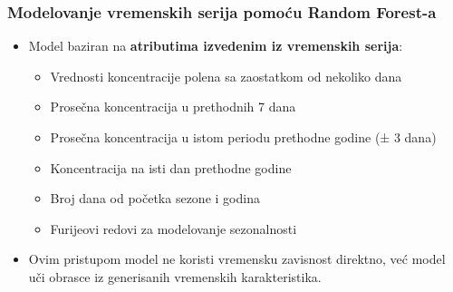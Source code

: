 \begin{frame}
    \frametitle{Modelovanje vremenskih serija pomoću Random Forest-a}

    \begin{itemize}
        \item Model baziran na \textbf{atributima izvedenim iz vremenskih serija}:
        \begin{itemize}
            \item Vrednosti koncentracije polena sa zaostatkom od nekoliko dana
            \item Prosečna koncentracija u prethodnih 7 dana
            \item Prosečna koncentracija u istom periodu prethodne godine (± 3 dana)
            \item Koncentracija na isti dan prethodne godine
            \item Broj dana od početka sezone i godina
            \item Furijeovi redovi za modelovanje sezonalnosti
        \end{itemize}

        \vspace{0.3cm}
        \item Ovim pristupom model ne koristi vremensku zavisnost direktno, već model uči obrasce iz generisanih vremenskih karakteristika.
    \end{itemize}
\end{frame}
